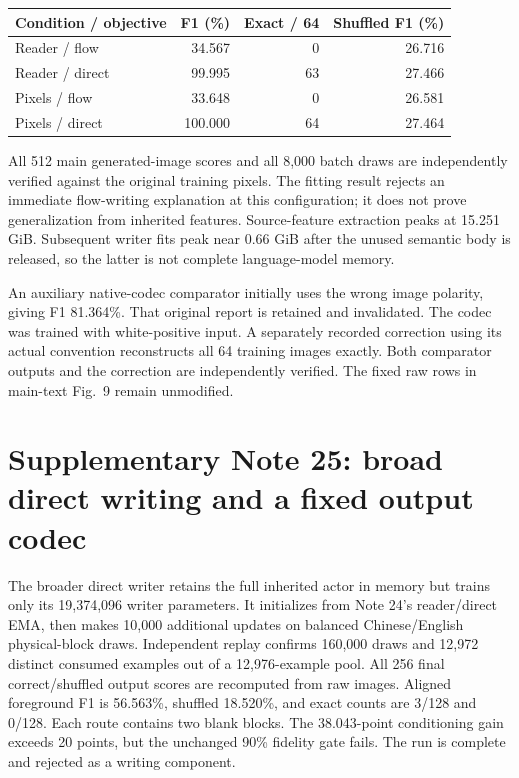 \documentclass[10pt,a4paper]{article}
\begin{document}
\begin{center}\small
\begin{tabular}{lrrr}\toprule
Condition / objective & F1 (\%) & Exact / 64 & Shuffled F1 (\%)\\\midrule
Reader / flow & 34.567 & 0 & 26.716\\
Reader / direct & 99.995 & 63 & 27.466\\
Pixels / flow & 33.648 & 0 & 26.581\\
Pixels / direct & 100.000 & 64 & 27.464\\\bottomrule
\end{tabular}
\end{center}
All 512 main generated-image scores and all 8,000 batch draws are independently
verified against the original training pixels. The fitting result rejects an
immediate flow-writing explanation at this configuration; it does not prove
generalization from inherited features. Source-feature extraction peaks at
15.251 GiB. Subsequent writer fits peak near 0.66 GiB after the unused semantic
body is released, so the latter is not complete language-model memory.

An auxiliary native-codec comparator initially uses the wrong image polarity,
giving F1 81.364\%. That original report is retained and invalidated. The
codec was trained with white-positive input. A separately recorded correction
using its actual convention reconstructs all 64 training images exactly.
Both comparator outputs and the correction are independently verified. The
fixed raw rows in main-text Fig.~9 remain unmodified.

\section*{Supplementary Note 25: broad direct writing and a fixed output codec}
The broader direct writer retains the full inherited actor in memory but
trains only its 19,374,096 writer parameters. It initializes from Note 24's
reader/direct EMA, then makes 10,000 additional updates on balanced
Chinese/English physical-block draws. Independent replay confirms 160,000
draws and 12,972 distinct consumed examples out of a 12,976-example pool.
All 256 final correct/shuffled output scores are recomputed from raw images.
Aligned foreground F1 is 56.563\%, shuffled 18.520\%, and exact counts are
3/128 and 0/128. Each route contains two blank blocks. The 38.043-point
conditioning gain exceeds 20 points, but the unchanged 90\% fidelity gate
fails. The run is complete and rejected as a writing component.
\end{document}
